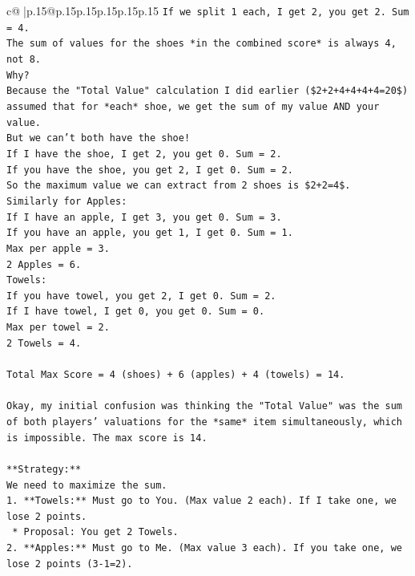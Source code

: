 \documentclass{article}
\begin{document}
{\begin{supertabular}{c@{$\;$}|p{.15\linewidth}@{}p{.15\linewidth}p{.15\linewidth}p{.15\linewidth}p{.15\linewidth}p{.15\linewidth}}
{{{\texttt{If we split 1 each, I get 2, you get 2. Sum = 4.} \\
\texttt{The sum of values for the shoes *in the combined score* is always 4, not 8.} \\
\texttt{Why?} \\
\texttt{Because the "Total Value" calculation I did earlier (\$2+2+4+4+4+4=20\$) assumed that for *each* shoe, we get the sum of my value AND your value.} \\
\texttt{But we can't both have the shoe!} \\
\texttt{If I have the shoe, I get 2, you get 0. Sum = 2.} \\
\texttt{If you have the shoe, you get 2, I get 0. Sum = 2.} \\
\texttt{So the maximum value we can extract from 2 shoes is \$2+2=4\$.} \\
\texttt{Similarly for Apples:} \\
\texttt{If I have an apple, I get 3, you get 0. Sum = 3.} \\
\texttt{If you have an apple, you get 1, I get 0. Sum = 1.} \\
\texttt{Max per apple = 3.} \\
\texttt{2 Apples = 6.} \\
\texttt{Towels:} \\
\texttt{If you have towel, you get 2, I get 0. Sum = 2.} \\
\texttt{If I have towel, I get 0, you get 0. Sum = 0.} \\
\texttt{Max per towel = 2.} \\
\texttt{2 Towels = 4.} \\
\\ 
\texttt{Total Max Score = 4 (shoes) + 6 (apples) + 4 (towels) = 14.} \\
\\ 
\texttt{Okay, my initial confusion was thinking the "Total Value" was the sum of both players' valuations for the *same* item simultaneously, which is impossible. The max score is 14.} \\
\\ 
\texttt{**Strategy:**} \\
\texttt{We need to maximize the sum.} \\
\texttt{1.  **Towels:** Must go to You. (Max value 2 each). If I take one, we lose 2 points.} \\
\texttt{    *   Proposal: You get 2 Towels.} \\
\texttt{2.  **Apples:** Must go to Me. (Max value 3 each). If you take one, we lose 2 points (3{-}1=2).} \\
}}}
\end{supertabular}}
\end{document}
